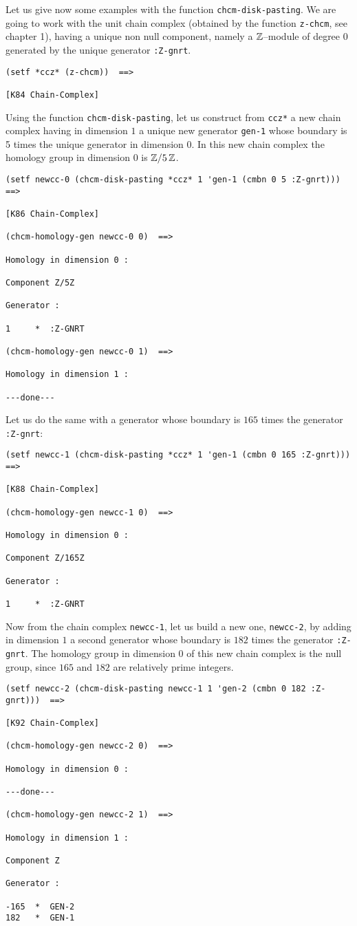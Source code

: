 Let us give now some examples with the function {\tt chcm-disk-pasting}. We are going to work with 
the unit chain complex (obtained by the function {\tt z-chcm}, see chapter 1), 
having a unique non null component, 
namely a ${\Bbb Z}$--module of degree $0$ generated by the unique generator {\tt :Z-gnrt}. 
{\footnotesize\begin{verbatim}
(setf *ccz* (z-chcm))  ==>

[K84 Chain-Complex]
\end{verbatim}}
Using the function {\tt chcm-disk-pasting}, let us construct from {\tt *ccz*}
a new chain complex  having in dimension $1$ a unique  new generator {\tt gen-1} 
whose boundary  is 5 times the unique generator in dimension $0$. In this new chain complex the
homology group in dimension $0$ is  ${{\Bbb Z}}/5\,{{\Bbb Z}}$.
{\footnotesize\begin{verbatim}
(setf newcc-0 (chcm-disk-pasting *ccz* 1 'gen-1 (cmbn 0 5 :Z-gnrt)))  ==>

[K86 Chain-Complex]

(chcm-homology-gen newcc-0 0)  ==>

Homology in dimension 0 :

Component Z/5Z

Generator :

1     *  :Z-GNRT

(chcm-homology-gen newcc-0 1)  ==>

Homology in dimension 1 :

---done---
\end{verbatim}}
Let us do the same with a generator whose boundary is  $165$ times the ge\-ne\-ra\-tor {\tt :Z-gnrt}:
{\footnotesize\begin{verbatim}
(setf newcc-1 (chcm-disk-pasting *ccz* 1 'gen-1 (cmbn 0 165 :Z-gnrt))) ==>

[K88 Chain-Complex]

(chcm-homology-gen newcc-1 0)  ==>

Homology in dimension 0 :

Component Z/165Z

Generator :

1     *  :Z-GNRT
\end{verbatim}}
Now from the chain complex {\tt newcc-1}, let us build a new one, {\tt newcc-2},
by adding in dimension $1$ a second generator whose boundary  is $182$ times
the generator {\tt :Z-gnrt}. The homology group in dimension $0$ of this new chain complex
is  the null group, since $165$ and $182$ are relatively prime integers.
{\footnotesize\begin{verbatim}
(setf newcc-2 (chcm-disk-pasting newcc-1 1 'gen-2 (cmbn 0 182 :Z-gnrt)))  ==>

[K92 Chain-Complex]

(chcm-homology-gen newcc-2 0)  ==>

Homology in dimension 0 :

---done---

(chcm-homology-gen newcc-2 1)  ==>

Homology in dimension 1 :

Component Z

Generator :

-165  *  GEN-2
182   *  GEN-1
\end{verbatim}}
